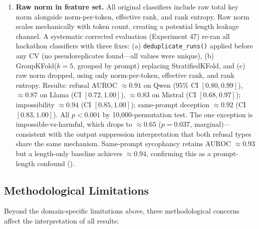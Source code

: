 \begin{enumerate}[leftmargin=*]
    \item \textbf{Raw norm in feature set.} All original classifiers include raw total key norm alongside norm-per-token, effective rank, and rank entropy. Raw norm scales mechanically with token count, creating a potential length leakage channel. A systematic corrected evaluation (Experiment 47) re-ran all hackathon classifiers with three fixes: (a) \texttt{deduplicate\_runs()} applied before any CV (no pseudoreplicates found---all values were unique), (b) GroupKFold($k\!=\!5$, grouped by prompt) replacing StratifiedKFold, and (c) raw norm dropped, using only norm-per-token, effective rank, and rank entropy. Results: refusal AUROC $\approx 0.91$ on Qwen (95\% CI $[0.80, 0.99]$), $\approx 0.87$ on Llama (CI $[0.72, 1.00]$), $\approx 0.83$ on Mistral (CI $[0.68, 0.97]$); impossibility $\approx 0.94$ (CI $[0.85, 1.00]$); same-prompt deception $\approx 0.92$ (CI $[0.83, 1.00]$). All $p < 0.001$ by 10{,}000-permutation test. The one exception is impossible-vs-harmful, which drops to $\approx 0.65$ ($p = 0.037$, marginal)---consistent with the output suppression interpretation that both refusal types share the same mechanism. Same-prompt sycophancy retains AUROC $\approx 0.93$ but a length-only baseline achieves $\approx 0.94$, confirming this as a prompt-length confound ().
\end{enumerate}

\subsection{Methodological Limitations}
\label{sec:methodological_limitations}

Beyond the domain-specific limitations above, three methodological concerns affect the interpretation of all results:

